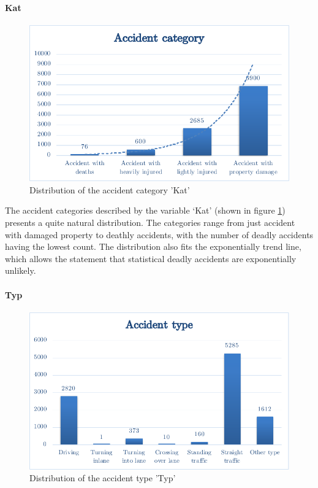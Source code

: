 \documentclass[a4paper,12pt]{report}
\begin{document}
\paragraph{Kat}
\begin{figure}[h]
	\centering
	\includegraphics[scale=0.6]{./assets/baysis_dataset_Kat.pdf}
	\caption{Distribution of the accident category 'Kat'}
	\label{img:baysis_dataset_Kat}
\end{figure}

The accident categories described by the variable ‘Kat’ (shown in figure \ref{img:baysis_dataset_Kat}) presents a quite natural distribution. The categories range from just accident with damaged property to deathly accidents, with the number of deadly accidents having the lowest count. The distribution also fits the exponentially trend line, which allows the statement that statistical deadly accidents are exponentially unlikely.

\paragraph{Typ}
\begin{figure}[h]
	\centering
	\includegraphics[scale=0.6]{./assets/baysis_dataset_Typ.pdf}
	\caption{Distribution of the accident type 'Typ'}
	\label{img:baysis_dataset_Typ}
\end{figure}
\end{document}
